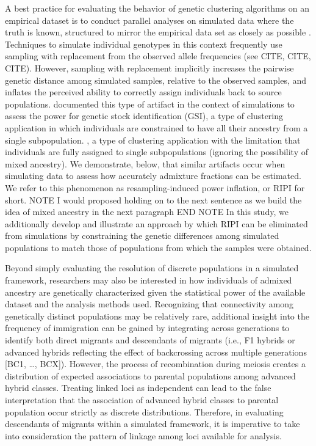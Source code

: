 A best practice for evaluating the behavior of genetic clustering algorithms on an empirical dataset is to conduct
parallel analyses on simulated data where the truth is known, structured to mirror the empirical data set
as closely as possible \citep{vaha2006efficiency,anderson2008improved,latch2011fine}.
Techniques to simulate individual genotypes in this context frequently use sampling with replacement from the 
observed allele frequencies (see CITE, CITE, CITE).
However, sampling with replacement implicitly increases the pairwise genetic distance among simulated samples, relative to the observed samples, and 
inflates the perceived ability to correctly assign individuals back to source populations. \citet{anderson2008improved}
documented this type of artifact in the context of simulations to assess the power for
genetic stock identification (GSI), a type of clustering application in which individuals are constrained to have
all their ancestry from a single subpopulation. 
, a type of clustering application with the limitation that individuals are fully assigned to single subpopulations (ignoring the possibility of mixed ancestry).
We demonstrate, below, that similar artifacts occur when simulating data to 
assess how accurately admixture fractions can be estimated.  We refer to this phenomenon as resampling-induced
power inflation, or RIPI for short.  
NOTE I would proposed holding on to the next sentence as we build the idea of mixed ancestry in the next paragraph END NOTE
In this study, we additionally develop and illustrate an approach by which RIPI can be eliminated
from simulations by constraining the genetic differences among simulated populations to match
those of populations from which the samples were obtained. 

Beyond simply evaluating the resolution of discrete populations in a simulated framework, researchers may also be 
interested in how individuals of admixed ancestry are genetically characterized given the statistical power of the available dataset and the analysis methods used.
Recognizing that connectivity among genetically distinct populations may be relatively rare, additional insight into the 
frequency of immigration can be gained by integrating across generations to identify both direct migrants and descendants of migrants
 (i.e., F1 hybrids or advanced hybrids reflecting the effect of backcrossing across multiple generations [BC1, \ldots, 
BCX]).
	However, the process of recombination during meiosis creates a distribution of expected associations to parental populations among advanced hybrid classes.
	Treating linked loci as independent can lead to the false interpretation that the association of advanced hybrid classes to parental population occur strictly as discrete distributions.
	Therefore, in evaluating descendants of migrants within a simulated framework, it is imperative to take into consideration the pattern of linkage among loci available for analysis.

